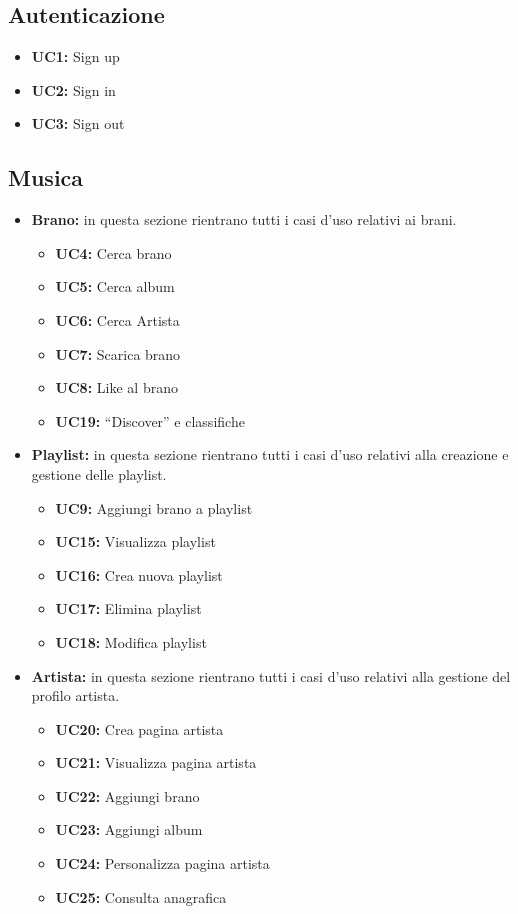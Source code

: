 \subsection{Autenticazione}
    \begin{itemize}
        \item \textbf{UC1:} Sign up 
        \item \textbf{UC2:} Sign in
        \item \textbf{UC3:} Sign out 
    \end{itemize}


\subsection{Musica}
\begin{itemize}
    \item \textbf{Brano:} in questa sezione rientrano tutti i casi d'uso relativi ai brani.
    \begin{itemize}
        \item \textbf{UC4:} Cerca brano
        \item \textbf{UC5:} Cerca album
        \item \textbf{UC6:} Cerca Artista
        \item \textbf{UC7:} Scarica brano
        \item \textbf{UC8:} Like al brano
        \item \textbf{UC19:} ``Discover'' e classifiche
    \end{itemize} 
    
    \item \textbf{Playlist:} in questa sezione rientrano tutti i casi d'uso relativi alla creazione e gestione delle playlist.
    \begin{itemize}
        \item \textbf{UC9:} Aggiungi brano a playlist
        \item \textbf{UC15:} Visualizza playlist 
        \item \textbf{UC16:} Crea nuova playlist 
        \item \textbf{UC17:} Elimina playlist
        \item \textbf{UC18:} Modifica playlist
    \end{itemize}
    
    \item \textbf{Artista:} in questa sezione rientrano tutti i casi d'uso relativi alla gestione del profilo artista.
    \begin{itemize}
        \item  \textbf{UC20:} Crea pagina artista 
        \item  \textbf{UC21:} Visualizza pagina artista 
        \item  \textbf{UC22:} Aggiungi brano 
        \item  \textbf{UC23:} Aggiungi album 
        \item  \textbf{UC24:} Personalizza pagina artista 
        \item  \textbf{UC25:} Consulta anagrafica
    \end{itemize} 
\end{itemize}

